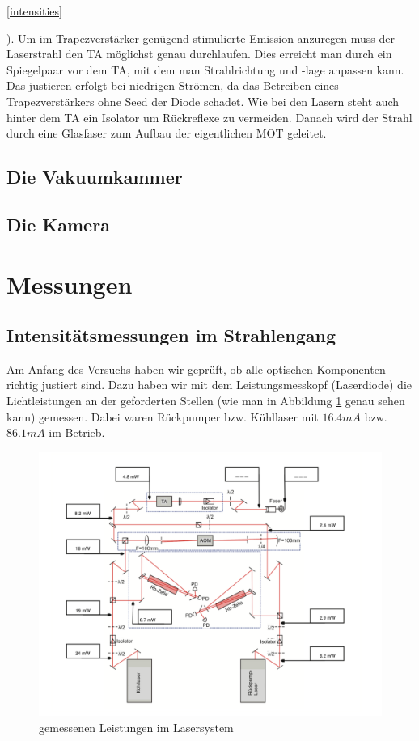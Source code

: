 \documentclass[12pt, a4paper]{article}
\begin{document}
    \ref{intensities}
    
    ). Um im Trapezverstärker genügend stimulierte Emission anzuregen
    muss der Laserstrahl den TA möglichst genau durchlaufen. Dies erreicht man durch
    ein Spiegelpaar vor dem TA, mit dem man Strahlrichtung und -lage anpassen kann. Das
    justieren erfolgt bei niedrigen Strömen, da das Betreiben eines Trapezverstärkers
    ohne Seed der Diode schadet. Wie bei den Lasern steht auch hinter dem TA ein
    Isolator um Rückreflexe zu vermeiden. Danach wird der Strahl durch eine Glasfaser
    zum Aufbau der eigentlichen MOT geleitet.
  \subsection{Die Vakuumkammer}
  \subsection{Die Kamera}
\newpage
\section{Messungen}
  \subsection{Intensitätsmessungen im Strahlengang}
  Am Anfang des Versuchs haben wir geprüft, ob alle optischen Komponenten richtig justiert sind. Dazu haben wir mit dem Leistungsmesskopf (Laserdiode) die Lichtleistungen an der geforderten Stellen (wie man in Abbildung \ref{leistung} genau sehen kann) gemessen. Dabei waren  Rückpumper bzw. Kühllaser mit $16.4 mA$ bzw. $86.1 mA$ im Betrieb.
  
    \begin{figure}[h!]
  \centering
  \includegraphics[width=1.\textwidth]{Strahlenleistungen.png}
  \caption{gemessenen Leistungen im Lasersystem}
  \label{leistung}
  \end{figure}
\end{document}
